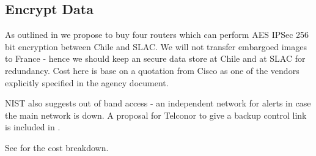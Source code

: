 \subsection{Encrypt Data} \label{sec:1encrypt}

As outlined in   we propose to buy four routers which can perform AES IPSec 256 bit encryption between Chile and SLAC.
We will not transfer embargoed images to France - hence we should keep an secure data store at Chile and at SLAC for redundancy.
Cost here is base on a quotation from Cisco as one of the vendors explicitly specified in the agency document.

NIST also suggests out of band access - an independent network for alerts in case the main network is down.
A proposal for Telconor to give a backup control link is included in .

See  for the cost breakdown.



